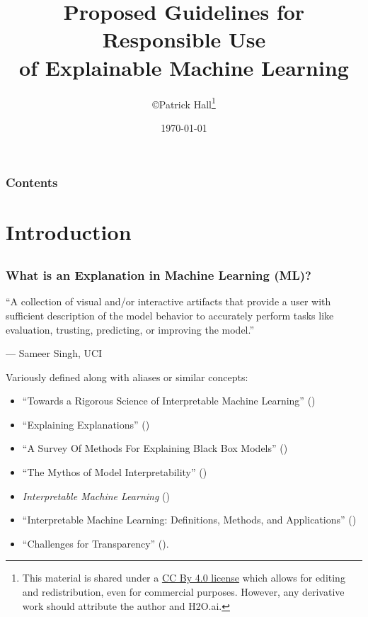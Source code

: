 \documentclass[11pt,
               aspectratio=169,
               hyperref={colorlinks}
               ]{beamer}
\author{\copyright\hspace{1pt}Patrick Hall\thanks{\tiny{This material is shared under a \href{https://creativecommons.org/licenses/by/4.0/deed.ast}{CC By 4.0 license} which allows for editing and redistribution, even for commercial purposes. However, any derivative work should attribute the author and H2O.ai.}}}
\title{Proposed Guidelines for Responsible Use\\of Explainable Machine Learning}
\institute{\href{https://www.h2o.ai}{H\textsubscript{2}O.ai}}
\date{\today}
\renewcommand*{\thefootnote}{\fnsymbol{footnote}}
\begin{document}
	
	\maketitle
	
	\begin{frame}
	
		\frametitle{Contents}
		
		\tableofcontents{}
		
	\end{frame}

\renewcommand*{\thefootnote}{\arabic{footnote}}

	\section{Introduction}

	\subsection*{} %

	\begin{frame}[t]
		
		\frametitle{What is an Explanation in Machine Learning (ML)?}
		
		\epigraph{“A collection of visual and/or interactive artifacts that provide a user with sufficient description of the model behavior to accurately perform tasks like evaluation, trusting, predicting, or improving the model.”}{--- \textup{Sameer Singh}, UCI}		
		
		\scriptsize Variously defined along with aliases or similar concepts:
		\begin{itemize}\scriptsize
			\item ``Towards a Rigorous Science of Interpretable Machine Learning'' (\citet{been_kim1})
			\item ``Explaining Explanations'' (\citet{gilpin2018explaining})
			\item ``A Survey Of Methods For Explaining Black Box Models'' (\citet{guidotti2018survey})
			\item ``The Mythos of Model Interpretability'' (\citet{lipton1})
		 	\item \textit{Interpretable Machine Learning} (\citet{molnar})
			\item ``Interpretable Machine Learning: Definitions, Methods, and Applications'' (\citet{murdoch2019interpretable})
			\item ``Challenges for Transparency'' (\citet{weller2017challenges}). 
		\end{itemize}\normalsize
		
	\end{frame}
	
\end{document}
